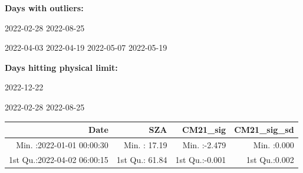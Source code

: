 \documentclass[
  10pt,
  a4paper,oneside]{article}
\begin{document}
\normalsize

\textbf{Days with outliers:}

2022-02-28 2022-08-25

2022-04-03 2022-04-19 2022-05-07 2022-05-19

\textbf{Days hitting physical limit:}

2022-12-22

2022-02-28 2022-08-25

\footnotesize

\begin{longtable}[]{@{}rrrr@{}}
\toprule
\begin{minipage}[b]{0.33\columnwidth}\raggedleft
Date\strut
\end{minipage} & \begin{minipage}[b]{0.19\columnwidth}\raggedleft
SZA\strut
\end{minipage} & \begin{minipage}[b]{0.19\columnwidth}\raggedleft
CM21\_sig\strut
\end{minipage} & \begin{minipage}[b]{0.19\columnwidth}\raggedleft
CM21\_sig\_sd\strut
\end{minipage}\tabularnewline
\midrule
\endhead
\begin{minipage}[t]{0.33\columnwidth}\raggedleft
Min. :2022-01-01 00:00:30\strut
\end{minipage} & \begin{minipage}[t]{0.19\columnwidth}\raggedleft
Min. : 17.19\strut
\end{minipage} & \begin{minipage}[t]{0.19\columnwidth}\raggedleft
Min. :-2.479\strut
\end{minipage} & \begin{minipage}[t]{0.19\columnwidth}\raggedleft
Min. :0.000\strut
\end{minipage}\tabularnewline
\begin{minipage}[t]{0.33\columnwidth}\raggedleft
1st Qu.:2022-04-02 06:00:15\strut
\end{minipage} & \begin{minipage}[t]{0.19\columnwidth}\raggedleft
1st Qu.: 61.84\strut
\end{minipage} & \begin{minipage}[t]{0.19\columnwidth}\raggedleft
1st Qu.:-0.001\strut
\end{minipage} & \begin{minipage}[t]{0.19\columnwidth}\raggedleft
1st Qu.:0.002\strut
\end{minipage}\tabularnewline

\end{longtable}
\end{document}
